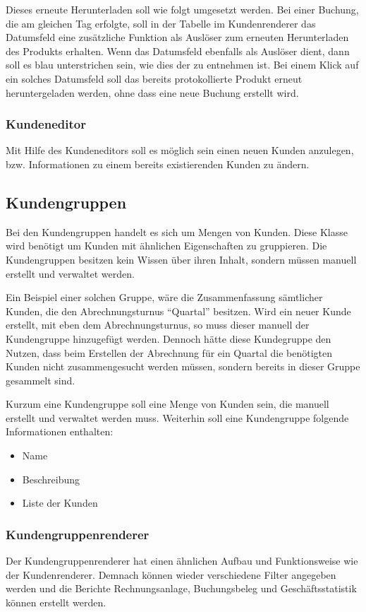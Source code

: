 Dieses erneute Herunterladen soll wie folgt umgesetzt werden. Bei einer Buchung, die am gleichen Tag erfolgte, soll in der Tabelle im Kundenrenderer das Datumsfeld eine zusätzliche Funktion als Auslöser zum erneuten Herunterladen des Produkts erhalten.
Wenn das Datumsfeld ebenfalls als Auslöser dient, dann soll es blau unterstrichen sein, wie dies der  zu entnehmen ist.
Bei einem Klick auf ein solches Datumsfeld soll das bereits protokollierte Produkt erneut heruntergeladen werden, ohne dass eine neue Buchung erstellt wird.

\subsubsection{Kundeneditor}
Mit Hilfe des Kundeneditors soll es möglich sein einen neuen Kunden anzulegen, bzw. Informationen zu einem bereits existierenden Kunden zu ändern.

\subsection{Kundengruppen}
Bei den Kundengruppen handelt es sich um Mengen von Kunden. Diese Klasse wird benötigt um Kunden mit ähnlichen Eigenschaften zu gruppieren.
Die Kundengruppen besitzen kein Wissen über ihren Inhalt, sondern müssen manuell erstellt und verwaltet werden.

Ein Beispiel einer solchen Gruppe, wäre die Zusammenfassung sämtlicher Kunden, die den Abrechnungsturnus "`Quartal"' besitzen. Wird ein neuer Kunde erstellt, mit eben dem Abrechnungsturnus, so muss dieser manuell der Kundengruppe hinzugefügt werden.
Dennoch hätte diese Kundegruppe den Nutzen, dass beim Erstellen der Abrechnung für ein Quartal die benötigten Kunden nicht zusammengesucht werden müssen, sondern bereits in dieser Gruppe gesammelt sind.

Kurzum eine Kundengruppe soll eine Menge von Kunden sein, die manuell erstellt und verwaltet werden muss. Weiterhin soll eine Kundengruppe folgende Informationen enthalten:
\begin{itemize}
\item Name
\item Beschreibung
\item Liste der Kunden
\end{itemize}
 
\subsubsection{Kundengruppenrenderer}
Der Kundengruppenrenderer hat einen ähnlichen Aufbau und Funktionsweise wie der Kundenrenderer.
Demnach können wieder verschiedene Filter angegeben werden  und die Berichte Rechnungsanlage, Buchungsbeleg und Geschäftsstatistik können erstellt werden.

